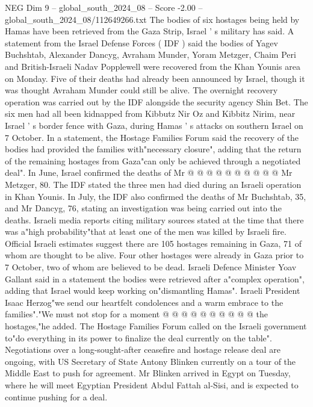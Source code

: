 \begin{textsample}{NEG Dim 9 – global\_south\_2024\_08 – Score -2.00 – global\_south\_2024\_08/112649266.txt}  \label{ex:f9_neg_339}
The bodies of six hostages being held by Hamas have been retrieved from the Gaza Strip, Israel ' s military has said.
A statement from the Israel Defense Forces ( IDF ) said the bodies of Yagev Buchshtab, Alexander Dancyg, Avraham Munder, Yoram Metzger, Chaim Peri and British-Israeli Nadav Popplewell were recovered from the Khan Younis area on Monday.
Five of their deaths had already been announced by Israel, though it was thought Avraham Munder could still be alive.
The overnight recovery operation was carried out by the IDF alongside the security agency Shin Bet.
The six men had all been kidnapped from Kibbutz Nir Oz and Kibbitz Nirim, near Israel ' s border fence with Gaza, during Hamas ' s attacks on southern Israel on 7 October.
In a statement, the Hostage Families Forum said the recovery of the bodies had provided the families with"necessary closure", adding that the return of the remaining hostages from Gaza"can only be achieved through a negotiated deal".
In June, Israel confirmed the deaths of Mr @ @ @ @ @ @ @ @ @ @ Mr Metzger, 80.
The IDF stated the three men had died during an Israeli operation in Khan Younis.
In July, the IDF also confirmed the deaths of Mr Buchshtab, 35, and Mr Dancyg, 76, stating an investigation was being carried out into the deaths.
Israeli media reports citing military sources stated at the time that there was a"high probability"that at least one of the men was killed by Israeli fire.
Official Israeli estimates suggest there are 105 hostages remaining in Gaza, 71 of whom are thought to be alive.
Four other hostages were already in Gaza prior to 7 October, two of whom are believed to be dead.
Israeli Defence Minister Yoav Gallant said in a statement the bodies were retrieved after a"complex operation", adding that Israel would keep working on"dismantling Hamas".
Israeli President Isaac Herzog"we send our heartfelt condolences and a warm embrace to the families"."We must not stop for a moment @ @ @ @ @ @ @ @ @ @ the hostages,"he added.
The Hostage Families Forum called on the Israeli government to"do everything in its power to finalize the deal currently on the table".
Negotiations over a long-sought-after ceasefire and hostage release deal are ongoing, with US Secretary of State Antony Blinken currently on a tour of the Middle East to push for agreement.
Mr Blinken arrived in Egypt on Tuesday, where he will meet Egyptian President Abdul Fattah al-Sisi, and is expected to continue pushing for a deal.

\end{textsample}
